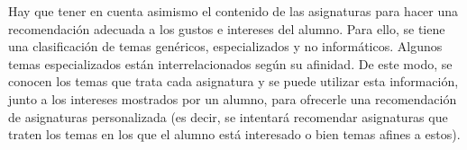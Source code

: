 Hay que tener en cuenta asimismo el contenido de las asignaturas para hacer 
una recomendación adecuada a los gustos e intereses del alumno. Para ello, 
se tiene una clasificación de temas genéricos, especializados y no 
informáticos. Algunos temas especializados están interrelacionados según su 
afinidad. De este modo, se conocen los temas que trata cada asignatura y se 
puede utilizar esta información, junto a los intereses mostrados por un 
alumno, para ofrecerle una recomendación de asignaturas personalizada (es 
decir, se intentará recomendar asignaturas que traten los temas en los que 
el alumno está interesado o bien temas afines a estos). 




